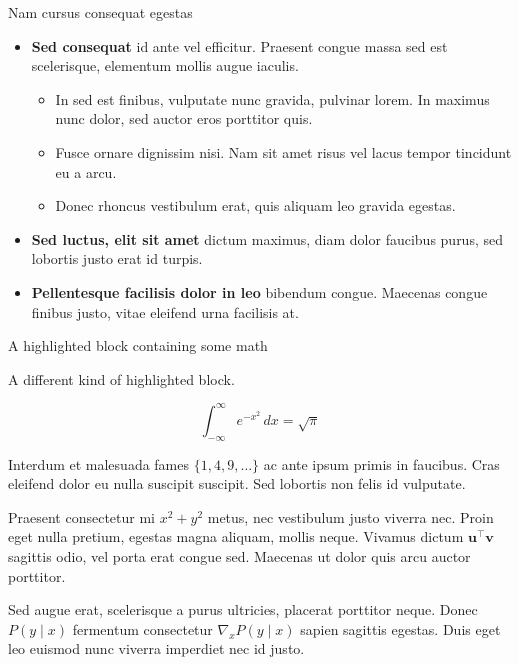 \documentclass[final]{beamer}
\newlength{\colwidth}
\begin{document}
\begin{frame}[t]
\begin{columns}[t]
\begin{column}{\colwidth}
\begin{block}{Nam cursus consequat egestas}
				\begin{itemize}
					\item \textbf{Sed consequat} id ante vel efficitur. Praesent congue massa
					      sed est scelerisque, elementum mollis augue iaculis.
					      \begin{itemize}
						      \item In sed est finibus, vulputate
						            nunc gravida, pulvinar lorem. In maximus nunc dolor, sed auctor eros
						            porttitor quis.
						      \item Fusce ornare dignissim nisi. Nam sit amet risus vel lacus
						            tempor tincidunt eu a arcu.
						      \item Donec rhoncus vestibulum erat, quis aliquam leo
						            gravida egestas.
					      \end{itemize}
					\item \textbf{Sed luctus, elit sit amet} dictum maximus, diam dolor
					      faucibus purus, sed lobortis justo erat id turpis.
					\item \textbf{Pellentesque facilisis dolor in leo} bibendum congue.
					      Maecenas congue finibus justo, vitae eleifend urna facilisis at.
				\end{itemize}

			\end{block}

			\begin{exampleblock}{A highlighted block containing some math}

				A different kind of highlighted block.

				$$
					\int_{-\infty}^{\infty} e^{-x^2}\,dx = \sqrt{\pi}
				$$

				Interdum et malesuada fames $\{1, 4, 9, \ldots\}$ ac ante ipsum primis in
				faucibus. Cras eleifend dolor eu nulla suscipit suscipit. Sed lobortis non
				felis id vulputate.


				Praesent consectetur mi $x^2 + y^2$ metus, nec vestibulum justo viverra
				nec. Proin eget nulla pretium, egestas magna aliquam, mollis neque. Vivamus
				dictum $\mathbf{u}^\intercal\mathbf{v}$ sagittis odio, vel porta erat
				congue sed. Maecenas ut dolor quis arcu auctor porttitor.


				Sed augue erat, scelerisque a purus ultricies, placerat porttitor neque.
				Donec $P(y \mid x)$ fermentum consectetur $\nabla_x P(y \mid x)$ sapien
				sagittis egestas. Duis eget leo euismod nunc viverra imperdiet nec id
				justo.


\end{exampleblock}
\end{column}
\end{columns}
\end{frame}
\end{document}
